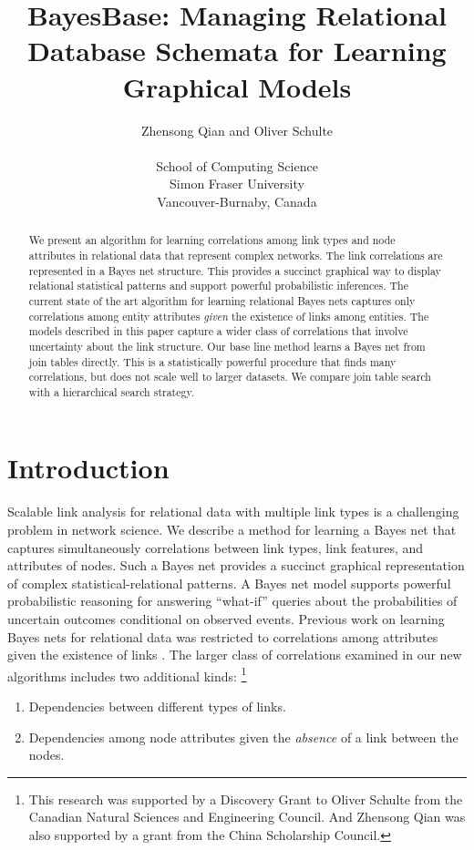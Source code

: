 \documentclass{article}
\begin{document}
\title{BayesBase: Managing Relational Database Schemata for Learning Graphical Models}
\author{Zhensong Qian and Oliver Schulte \\
\\ School of Computing Science\\ Simon Fraser University\\Vancouver-Burnaby, Canada}


\maketitle

\begin{abstract} 
We present an algorithm for learning correlations among link types and node attributes in relational data that represent complex networks. 
The link correlations are represented in a Bayes net structure. This provides a succinct graphical way to display relational statistical patterns and support powerful probabilistic inferences. The current state of the art algorithm for learning relational Bayes nets captures only correlations among entity attributes {\em given} the existence of links among entities. The models described in this paper capture a wider class of correlations that involve uncertainty about the link structure. Our base line method learns a Bayes net from join tables directly. This is  a statistically powerful procedure that finds many correlations, but does not scale well to larger datasets. We compare join table search with a hierarchical search strategy.
\end{abstract}


\section{Introduction} 
Scalable link analysis for relational data with multiple link types is a challenging problem in network science.
 We describe a method for learning a Bayes net that captures simultaneously correlations between link types, link features, and attributes of nodes. Such a Bayes net provides a succinct graphical representation of complex statistical-relational patterns. A  Bayes net model supports powerful probabilistic reasoning for answering ``what-if'' queries about the probabilities of uncertain outcomes conditional on observed events.
Previous work on learning Bayes nets for relational data was restricted to correlations among attributes given the existence of links \cite{Schulte2012}. The larger class of correlations examined in our new algorithms includes two additional kinds:
\footnote{
This research was supported by a Discovery Grant to Oliver Schulte from the Canadian Natural Sciences and Engineering Council. 
And Zhensong Qian was also supported by a grant from the China Scholarship Council.

}
\begin{enumerate}
\item Dependencies between  different types of links.
\item Dependencies among node attributes given the {\em absence} of a link between the nodes.
\end{enumerate}
\end{document}
